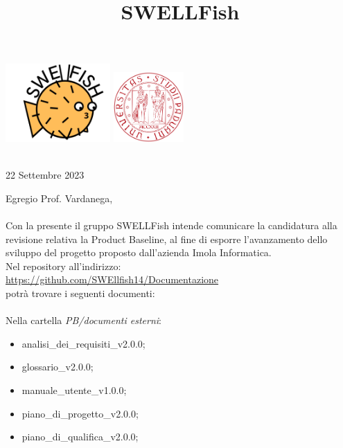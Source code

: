 \documentclass[12pt]{article}
\begin{document}
\graphicspath{ {../templates/img/} }
\title{SWELLFish}

\begin{center}
    \includegraphics[width=0.3\textwidth]{../templates/img/Swellfish_logo.png}
    \hspace{3cm}
    \includegraphics[width=0.2\textwidth]{../templates/img/logoUnipd.png}\\
    \end{center}
    \begin{flushright}
        \
        \textbf{}\\
        22 Settembre 2023
    \end{flushright}  

Egregio Prof. Vardanega,\\
\\
Con la presente il gruppo SWELLFish intende comunicare la candidatura alla revisione relativa la Product
Baseline, al fine di esporre l'avanzamento dello sviluppo del progetto proposto dall'azienda Imola Informatica.
\\

Nel repository all'indirizzo: \\
\href{https://github.com/SWEllfish14/Documentazione}{\underline{https://github.com/SWEllfish14/Documentazione}}\\ 
potrà trovare i seguenti documenti:\\\\

Nella cartella \textit{PB/documenti esterni}:
    \begin{itemize}
    \item analisi\_dei\_requisiti\_v2.0.0;
    \item glossario\_v2.0.0;
    \item manuale\_utente\_v1.0.0;
    \item piano\_di\_progetto\_v2.0.0;
    \item piano\_di\_qualifica\_v2.0.0;
    \end{itemize}
\end{document}
